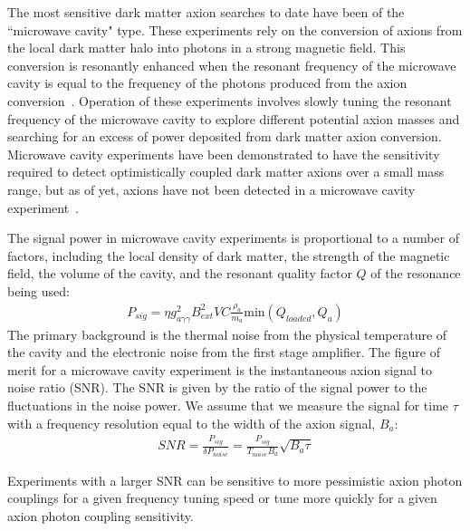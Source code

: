 \documentclass[aps,prl,twocolumn,groupedaddress]{revtex4-1}
\begin{document}
The most sensitive dark matter axion searches to date have been of the ``microwave cavity" type.
These experiments rely on the conversion of axions from the local dark matter halo into photons in a strong magnetic field.
This conversion is resonantly enhanced when the resonant frequency of the microwave cavity is equal to the frequency of the photons produced from the axion conversion~\cite{PhysRevLett.51.1415}.
Operation of these experiments involves slowly tuning the resonant frequency of the microwave cavity to explore different potential axion masses and searching for an excess of power deposited from dark matter axion conversion.
Microwave cavity experiments have been demonstrated to have the sensitivity required to detect optimistically coupled dark matter axions over a small mass range,
but as of yet, axions have not been detected in a microwave cavity experiment~\cite{PhysRevLett.104.041301}.

The signal power in microwave cavity experiments is proportional to a number of factors, including the local density of dark matter, the strength of the magnetic field, the volume of the cavity, and the resonant 
quality factor $Q$ of the resonance being used:
\begin{align}
P_{sig} = \eta g_{a\gamma\gamma}^2B_{ext}^2VC\frac{\rho_a}{m_a}\text{min}(Q_{loaded},Q_a)
\end{align}
The primary background is the thermal noise from the physical temperature of the cavity and the electronic noise from the first stage amplifier.  
The figure of merit for a microwave cavity experiment is the instantaneous axion signal to noise ratio (SNR).
The SNR is given by the ratio of the signal power to the fluctuations in the noise power. We assume that we measure the signal for time $\tau$ with a frequency resolution equal to the width of the axion signal, $B_a$:
\begin{align}
SNR = \frac{P_{sig}}{\delta P_{noise}} = \frac{P_{sig}}{T_{noise}B_a}\sqrt{B_a \tau}
\end{align}

Experiments with a larger SNR can be sensitive to more pessimistic axion photon couplings for a given frequency tuning speed or tune more quickly for a given axion photon coupling sensitivity.
\end{document}
